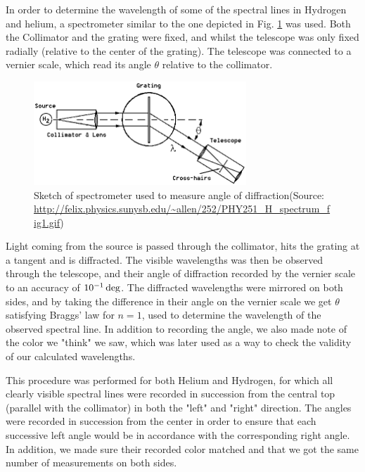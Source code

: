 \documentclass[11pt,a4paper]{article}
\begin{document}
    In order to determine the wavelength of some of the spectral lines in Hydrogen and helium, a spectrometer similar to the one depicted in Fig. \ref{fig:spectrometer} was used. Both the Collimator and the grating were fixed, and whilst the telescope was only fixed radially (relative to the center of the grating). The telescope was connected to a vernier scale, which read its angle $\theta$ relative to the collimator.

    \begin{figure}[H]
        \center
        \includegraphics[width=8cm]{scripts/figs/PHY251_H_spectrum_fig1.png}
        \caption{Sketch of spectrometer used to measure angle of diffraction(Source: \url{http://felix.physics.sunysb.edu/~allen/252/PHY251_H_spectrum_fig1.gif})}
        \label{fig:spectrometer}
    \end{figure}

    Light coming from the source is passed through the collimator, hits the grating at a tangent and is diffracted. The visible wavelengths was then be observed through the telescope, and their angle of diffraction recorded by the vernier scale to an accuracy of $10^{-1}\,\textup{deg}$. The diffracted wavelengths were mirrored on both sides, and by taking the difference in their angle on the vernier scale we get $\theta$ satisfying Braggs' law for $n=1$, used to determine the wavelength of the observed spectral line. In addition to recording the angle, we also made note of the color we "think" we saw, which was later used as a way to check the validity of our calculated wavelengths.

    This procedure was performed for both Helium and Hydrogen, for which all clearly visible spectral lines were recorded in succession from the central top (parallel with the collimator) in both the "left" and "right" direction. The angles were recorded in succession from the center in order to ensure that each successive left angle would be in accordance with the corresponding right angle. In addition, we made sure their recorded color matched and that we got the same number of measurements on both sides.
\end{document}
